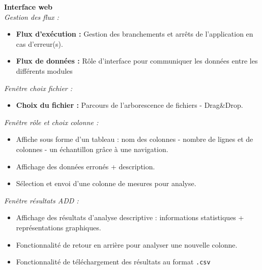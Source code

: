 	\begin{frame}
		\textbf{Interface web}\\
		\textit{Gestion des flux :}
		\begin{itemize}
			\item \textbf{Flux d'exécution :} Gestion des branchements et arrêts de l'application en cas d'erreur(s).
			\item \textbf{Flux de données :} Rôle d'interface pour communiquer les données entre les différents modules
		\end{itemize} \pause
		 \vspace{1cm}
		 
		\textit{Fenêtre choix fichier :}
		\begin{itemize}
			\item \textbf{Choix du fichier :} Parcours de l'arborescence de fichiers - Drag\&Drop.
		\end{itemize}
	\end{frame}
	
	\begin{frame}
		\textit{Fenêtre rôle et choix colonne :}
		\begin{itemize}
		\item Affiche sous forme d'un tableau : nom des colonnes - nombre de lignes et de colonnes - un échantillon grâce à une navigation.
		\item Affichage des données erronés + description.
		\item Sélection et envoi d'une colonne de mesures pour analyse. 
		\end{itemize} \pause
		 \vspace{1cm}
		 
		\textit{Fenêtre résultats ADD :}
		\begin{itemize}
		\item Affichage des résultats d'analyse descriptive : informations statistiques + représentations graphiques.
		\item Fonctionnalité de retour en arrière pour analyser une nouvelle colonne.
		\item Fonctionnalité de téléchargement des résultats au format \lstinline!.csv!
		\end{itemize}
	\end{frame}
	
